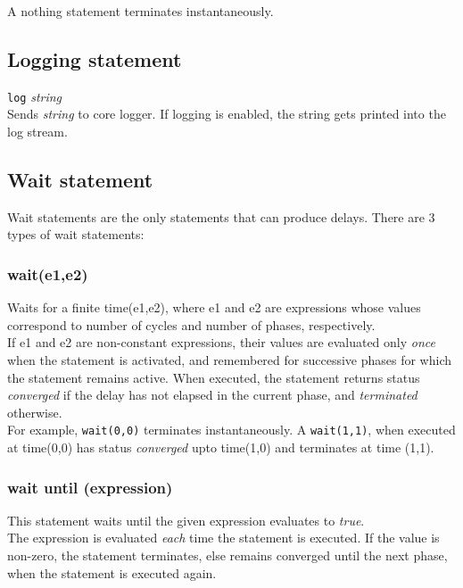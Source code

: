 	A nothing statement terminates instantaneously.

	\subsection{Logging statement}
		\texttt{log} \textit{string}\\
	Sends \textit{string} to core logger. If logging is enabled,
	the string gets printed into the log stream.

	\subsection{Wait statement}
	Wait statements are the only statements that can produce delays.
	There are 3 types of wait statements:


	\subsubsection{wait(e1,e2)}

	Waits for a finite time(e1,e2), where e1 and e2 are expressions whose values correspond to 
	number of cycles and number of phases, respectively.\\


	If e1 and e2 are non-constant expressions, their values are evaluated only \emph{once} 
	when the statement is activated, and remembered for successive phases for which the 
	statement remains active. When executed, the statement returns status \emph{converged}
	if the delay has not elapsed in the current phase, and \emph{terminated} otherwise.\\


	For example, \texttt{wait(0,0)} terminates instantaneously. 
	A \texttt{wait(1,1)}, when executed at time(0,0) has status \emph{converged}
	upto time(1,0) and terminates at time (1,1).


	\subsubsection{wait until (expression)}

	This statement waits until the given expression evaluates to \emph{true}.\\

	The expression is evaluated \emph{each} time the statement is executed. If the value is non-zero,
	the statement terminates, else remains converged until the next phase, when the statement is executed again.

